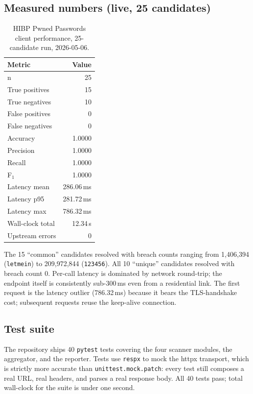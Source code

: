 \documentclass[conference]{IEEEtran}
\begin{document}
\subsection{Measured numbers (live, 25 candidates)}
\begin{table}[htbp]
\caption{HIBP Pwned Passwords client performance, 25-candidate run, 2026-05-06.}
\label{tab:eval}
\centering
\renewcommand{\arraystretch}{1.1}
\begin{tabular}{lr}
\toprule
\textbf{Metric} & \textbf{Value} \\
\midrule
n                 & 25        \\
True positives    & 15        \\
True negatives    & 10        \\
False positives   & 0         \\
False negatives   & 0         \\
Accuracy          & 1.0000    \\
Precision         & 1.0000    \\
Recall            & 1.0000    \\
F$_1$             & 1.0000    \\
Latency mean      & 286.06\,ms \\
Latency p95       & 281.72\,ms \\
Latency max       & 786.32\,ms \\
Wall-clock total  & 12.34\,s   \\
Upstream errors   & 0         \\
\bottomrule
\end{tabular}
\end{table}

The 15 ``common'' candidates resolved with breach counts ranging
from 1{,}406{,}394 (\texttt{letmein}) to 209{,}972{,}844
(\texttt{123456}). All 10 ``unique'' candidates resolved with breach
count 0. Per-call latency is dominated by network round-trip; the
endpoint itself is consistently sub-300\,ms even from a residential
link. The first request is the latency outlier (786.32\,ms) because
it bears the TLS-handshake cost; subsequent requests reuse the
keep-alive connection.

\subsection{Test suite}
The repository ships 40 \texttt{pytest} tests covering the four
scanner modules, the aggregator, and the reporter. Tests use
\texttt{respx} to mock the httpx transport, which is strictly more
accurate than \texttt{unittest.mock.patch}: every test still composes
a real URL, real headers, and parses a real response body. All 40
tests pass; total wall-clock for the suite is under one second.
\end{document}
